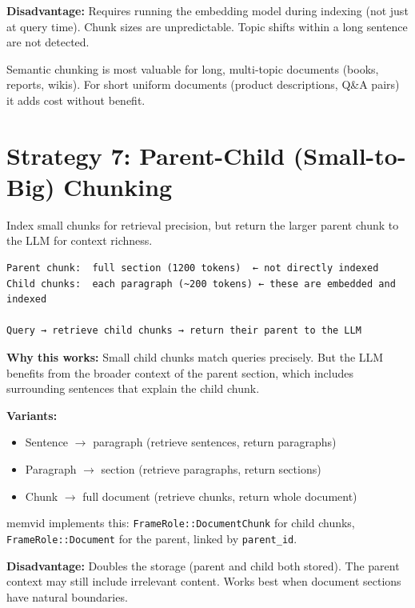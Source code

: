 \textbf{Disadvantage:} Requires running the embedding model during indexing (not just at query
time). Chunk sizes are unpredictable. Topic shifts within a long sentence are not detected.

Semantic chunking is most valuable for long, multi-topic documents (books, reports, wikis).
For short uniform documents (product descriptions, Q\&A pairs) it adds cost without benefit.

\section{Strategy 7: Parent-Child (Small-to-Big) Chunking}

Index small chunks for retrieval precision, but return the larger parent chunk to the LLM
for context richness.

\begin{Verbatim}
Parent chunk:  full section (1200 tokens)  ← not directly indexed
Child chunks:  each paragraph (~200 tokens) ← these are embedded and indexed

Query → retrieve child chunks → return their parent to the LLM
\end{Verbatim}

\textbf{Why this works:} Small child chunks match queries precisely. But the LLM benefits
from the broader context of the parent section, which includes surrounding sentences that
explain the child chunk.

\textbf{Variants:}

\begin{itemize}
    \item Sentence $\to$ paragraph (retrieve sentences, return paragraphs)
    \item Paragraph $\to$ section (retrieve paragraphs, return sections)
    \item Chunk $\to$ full document (retrieve chunks, return whole document)
\end{itemize}

memvid implements this: \texttt{FrameRole::DocumentChunk} for child chunks,
\texttt{FrameRole::Document} for the parent, linked by \texttt{parent\_id}.

\textbf{Disadvantage:} Doubles the storage (parent and child both stored). The parent context
may still include irrelevant content. Works best when document sections have natural boundaries.

